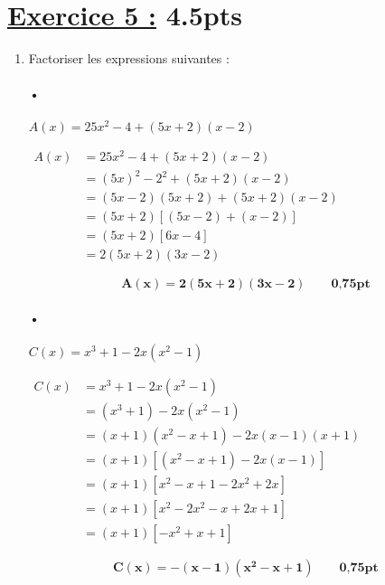 \documentclass[12pt,a4paper]{article}
\begin{document}
\section*{\underline{Exercice 5 :} 4.5pts}
\begin{enumerate}
    \item Factoriser les expressions suivantes :
 
\paragraph{•}   
\( A(x) = 25x^2 - 4 + (5x + 2)(x - 2) \)

\(
\begin{aligned}
A(x) &= 25x^2 - 4 + (5x + 2)(x - 2) \\
     &= (5x)^2 - 2^2 + (5x + 2)(x - 2) \\
     &= (5x - 2)(5x + 2) + (5x + 2)(x - 2) \\
     &= (5x + 2)\left[(5x - 2) + (x - 2)\right] \\
     &= (5x + 2)\left[6x - 4\right] \\
     &= 2(5x + 2)(3x - 2)
\end{aligned}
\)

\begin{tcolorbox}[colback=yellow!20, colframe=black, sharp corners]
    \[
    \mathbf{A(x) = 2(5x + 2)(3x - 2)}\quad\quad \textbf{0,75pt}
    \]
\end{tcolorbox}

\paragraph{•}
\(
C(x) = x^3 + 1 - 2x(x^2 - 1)
\)

\(
\begin{aligned}
C(x) &= x^3 + 1 - 2x(x^2 - 1) \\
     &= (x^3 + 1) - 2x(x^2 - 1)\\
     &=(x + 1)(x^2 - x + 1) - 2x(x - 1)(x + 1)\\
     &= (x + 1) \left[(x^2 - x + 1) - 2x(x - 1) \right]\\
     &= (x + 1) \left[x^2 - x + 1 - 2x^2 + 2x \right] \\
     &= (x + 1) \left[x^2 - 2x^2 - x + 2x + 1 \right] \\
     &= (x + 1) \left[-x^2 + x + 1 \right]
\end{aligned}
\)



\begin{tcolorbox}[colback=yellow!20, colframe=black, sharp corners]
    \[
    \mathbf{C(x) = -(x - 1)(x^2 - x + 1)}\quad\quad \textbf{0,75pt}
    \]
\end{tcolorbox}


\end{enumerate}
\end{document}
